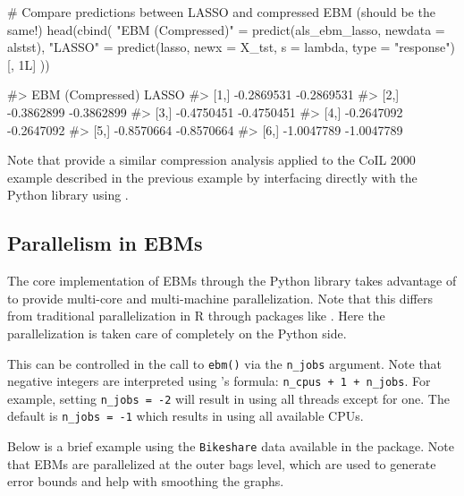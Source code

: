 \begin{Schunk}
\begin{Sinput}
# Compare predictions between LASSO and compressed EBM (should be the same!)
head(cbind(
  "EBM (Compressed)" = predict(als_ebm_lasso, newdata = alstst),
  "LASSO" = predict(lasso, newx = X_tst, s = lambda, type = "response")[, 1L]
))
\end{Sinput}
\begin{Soutput}
#>      EBM (Compressed)      LASSO
#> [1,]       -0.2869531 -0.2869531
#> [2,]       -0.3862899 -0.3862899
#> [3,]       -0.4750451 -0.4750451
#> [4,]       -0.2647092 -0.2647092
#> [5,]       -0.8570664 -0.8570664
#> [6,]       -1.0047789 -1.0047789
\end{Soutput}
\end{Schunk}

Note that \citet{greenwell-2023-explainable} provide a similar
compression analysis applied to the CoIL 2000 example described in the
previous example by interfacing directly with the  Python
library using .

\subsection{Parallelism in EBMs}\label{parallelism-in-ebms}

The core implementation of EBMs through the  Python
library takes advantage of  \citep{Py-joblib} to provide
multi-core and multi-machine parallelization. Note that this differs
from traditional parallelization in R through packages like
 \citep{R-parallel}. Here the parallelization is taken
care of completely on the Python side.

This can be controlled in the call to \texttt{ebm()} via the
\texttt{n\_jobs} argument. Note that negative integers are interpreted
using 's formula: \texttt{n\_cpus\ +\ 1\ +\ n\_jobs}. For
example, setting \texttt{n\_jobs\ =\ -2} will result in using all
threads except for one. The default is \texttt{n\_jobs\ =\ -1} which
results in using all available CPUs.

Below is a brief example using the \texttt{Bikeshare} data available in
the  \citep{R-ISLR2} package. Note that EBMs are
parallelized at the outer bags level, which are used to generate error
bounds and help with smoothing the graphs.


